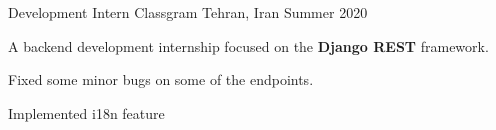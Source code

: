 \begin{cventries}

  \cventry
    {Development Intern} %
    {Classgram} %
    {Tehran, Iran} %
    {Summer 2020} %
    {
      \begin{cvitems} %
	\item {A backend development internship focused on the {\textbf{Django REST}} framework.}
        \item {Fixed some minor bugs on some of the endpoints.}
	\item{Implemented i18n feature}
      \end{cvitems}
    }


\end{cventries}
